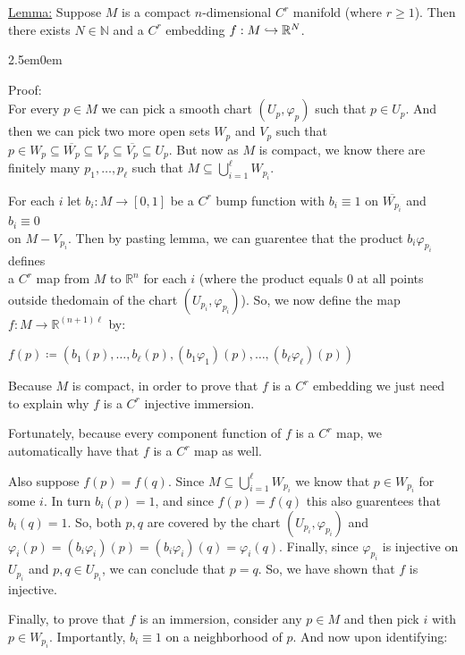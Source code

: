 \documentclass{book}
\renewcommand{\hookrightarrow}{\lhook\joinrel\rightarrow}
\newcommand{\exTwo}{%
   \color{Purple}%
   \fontsize{13}{15}\selectfont%
}
\newcommand{\exThreeP}{%
   \color{RedViolet}%
   \fontsize{12}{14}\selectfont%
}
\newenvironment{myIndent}{%
   \begin{adjustwidth}{2.5em}{0em}%
}{%
   \end{adjustwidth}%
}
\newcommand{\retTwo}{\hfill\bigbreak}
\begin{document}
\exTwo\ul{Lemma:} Suppose $M$ is a compact $n$-dimensional $C^r$ manifold (where $r \geq 1$). Then there exists $N \in \mathbb{N}$ and a $C^r$ embedding $f: M \hookrightarrow \mathbb{R}^N$.
\begin{myIndent}\exThreeP
	Proof:\\
	For every $p \in M$ we can pick a smooth chart $(U_p, \varphi_p)$ such that $p \in U_p$. And then we can pick two more open sets $W_p$ and $V_p$ such that $p \in W_p \subseteq \overline{W_p} \subseteq V_p \subseteq \overline{V_p} \subseteq U_p$. But now as $M$ is compact, we know  there are finitely many $p_1, \ldots, p_\ell$ such that $M \subseteq \bigcup_{i=1}^\ell W_{p_i}$.\retTwo

	For each $i$ let $b_i: M \to [0, 1]$ be a $C^r$ bump function with $b_i \equiv 1$ on $\overline{W_{p_i}}$ and $b_i \equiv 0$\\ on $M - V_{p_i}$. Then by pasting lemma, we can guarentee that the product $b_i \varphi_{p_i}$ defines\\ a $C^r$ map from $M$ to $\mathbb{R}^n$ for each $i$ (where the product equals $0$ at all points outside the\newpage domain of the chart $(U_{p_i}, \varphi_{p_i})$). So, we now define the map $f: M \to \mathbb{R}^{(n + 1)\ell}$ by:

	{\centering $f(p) \coloneqq \left(b_1(p), \ldots, b_\ell(p), (b_1\varphi_1)(p), \ldots, (b_\ell\varphi_\ell)(p)\right)$\retTwo\par}

	Because $M$ is compact, in order to prove that $f$ is a $C^r$ embedding we just need to explain why $f$ is a $C^r$ injective immersion.\retTwo

	Fortunately, because every component function of $f$ is a $C^r$ map, we automatically have that $f$ is a $C^r$ map as well.\retTwo
	
	Also suppose $f(p) = f(q)$. Since $M \subseteq \bigcup_{i=1}^\ell W_{p_i}$ we know that $p \in W_{p_i}$ for some $i$. In turn $b_i(p) = 1$, and since $f(p) = f(q)$ this also guarentees that $b_i(q) = 1$. So, both $p, q$ are covered by the chart $(U_{p_i}, \varphi_{p_i})$ and $\varphi_i(p) = (b_i \varphi_i)(p) = (b_i \varphi_i)(q) = \varphi_i(q)$. Finally, since $\varphi_{p_i}$ is injective on $U_{p_i}$ and $p, q \in U_{p_i}$, we can conclude that $p = q$. So, we have shown that $f$ is injective.\retTwo

	Finally, to prove that $f$ is an immersion, consider any $p \in M$ and then pick $i$ with $p \in W_{p_i}$. Importantly, $b_i \equiv 1$ on a neighborhood of $p$. And now upon identifying:
	

\end{myIndent}
\end{document}
